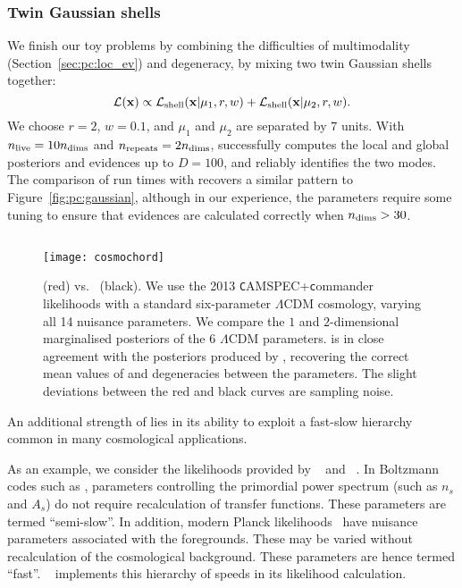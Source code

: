\subsubsection{Twin Gaussian shells}
We finish our toy problems by combining the difficulties of multimodality (Section~\ref{sec:pc:loc_ev}) and degeneracy, by mixing two twin Gaussian shells together:
\begin{equation}
  \mathcal{L}(\mathbf{x}) \propto \mathcal{L}_{\mathrm{shell}}(\mathbf{x}|\mathbf{\mu}_1,r,w) + \mathcal{L}_{\mathrm{shell}}(\mathbf{x}|\mathbf{\mu}_2,r,w).
  \label{eqn:pc:gaussian_shells}
\end{equation}
We choose $r=2$, $w=0.1$, and $\mu_1$ and $\mu_2$ are separated by $7$ units. With $n_{\mathrm{live}}=10n_{\mathrm{dims}}$ and $n_{\mathrm{repeats}}=2n_{\mathrm{dims}}$, \PolyChord{} successfully computes the local and global posteriors and evidences up to $D=100$, and reliably identifies the two modes. The comparison of run times with \MultiNest{} recovers a similar pattern to Figure~\ref{fig:pc:gaussian}, although in our experience, the \MultiNest{} parameters require some tuning to ensure that evidences are calculated correctly when $n_{\mathrm{dims}}>30$.


\subsection{\CosmoChord}
\label{sec:pc:cosmochord}

\begin{figure}
  \centering
  \texttt{[image: cosmochord]}
  \caption{\CosmoChord{} (red) vs.\ \CosmoMC{} (black). We use the 2013 {\texttt CAMSPEC}+{\texttt commander} likelihoods with a standard six-parameter $\Lambda$CDM cosmology, varying all 14 nuisance parameters.  We compare the $1$ and $2$-dimensional marginalised posteriors of the $6$ $\Lambda$CDM parameters. \CosmoChord{} is in close agreement with the posteriors produced by \CosmoMC{}, recovering the correct mean values of and degeneracies between the parameters. The slight deviations between the red and black curves are sampling noise. \label{fig:pc:cosmochord}}
\end{figure}

An additional strength of \PolyChord{} lies in its ability to exploit a fast-slow hierarchy common in many cosmological applications. 

As an example, we consider the likelihoods provided by \CAMB{}~\citep{CAMB} and \CosmoMC{}~\citep{cosmomc}. In Boltzmann codes such as \CAMB{}, parameters controlling the primordial power spectrum (such as $n_s$ and $A_s$) do not require recalculation of transfer functions. These parameters are termed ``semi-slow''. In addition, modern Planck likelihoods~\citep{Planck2013Like} have nuisance parameters associated with the foregrounds. These may be varied without recalculation of the cosmological background. These parameters are hence termed ``fast''. \CosmoMC{}~\citep{cosmomc} implements this hierarchy of speeds in its likelihood calculation.

